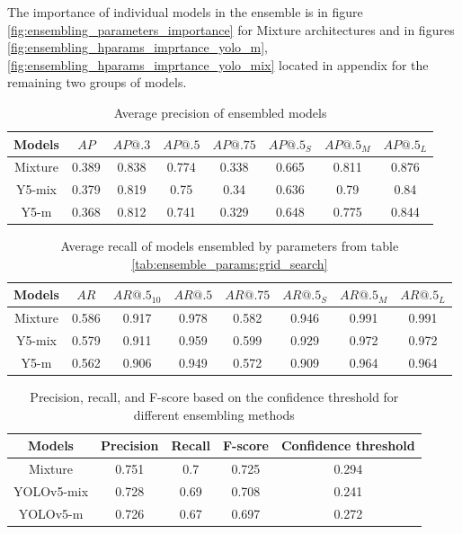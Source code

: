 The importance of individual models in the ensemble is in figure \ref{fig:ensembling_parameters_importance} for Mixture architectures and in figures \ref{fig:ensembling_hparams_imprtance_yolo_m}, \ref{fig:ensembling_hparams_imprtance_yolo_mix} located in appendix for the remaining two groups of models.


\begin{table}[h]
    \centering
    \begin{tabular}{|c|c|c|c|c|c|c|c|}
        \hline
        Models  & $AP$  & $AP@.3$ & $AP@.5$ & $AP@.75$ & $AP@.5_S$ & $AP@.5_M$ & $AP@.5_L$ \\ \hline
        Mixture & 0.389 & 0.838   & 0.774   & 0.338    & 0.665     & 0.811     & 0.876     \\ \hline
        Y5-mix  & 0.379 & 0.819   & 0.75    & 0.34     & 0.636     & 0.79      & 0.84      \\ \hline
        Y5-m    & 0.368 & 0.812   & 0.741   & 0.329    & 0.648     & 0.775     & 0.844     \\ \hline
    \end{tabular}
    \caption{Average precision of ensembled models}
    \label{tab:precision:ensemble_compare}
\end{table}


\begin{table}[h]
    \centering
    \begin{tabular}{|c|c|c|c|c|c|c|c|}
        \hline
        Models  & $AR$  & $AR@.5_{10}$ & $AR@.5$ & $AR@.75$ & $AR@.5_S$ & $AR@.5_M$ & $AR@.5_L$ \\ \hline
        Mixture & 0.586 & 0.917        & 0.978   & 0.582    & 0.946     & 0.991     & 0.991     \\ \hline
        Y5-mix  & 0.579 & 0.911        & 0.959   & 0.599    & 0.929     & 0.972     & 0.972     \\ \hline
        Y5-m    & 0.562 & 0.906        & 0.949   & 0.572    & 0.909     & 0.964     & 0.964     \\ \hline
    \end{tabular}
    \caption{Average recall of models ensembled by parameters from table \ref{tab:ensemble_params:grid_search}}
    \label{tab:recall:ensemble_compare}
\end{table}


\begin{table}[h]
    \begin{tabular}{|c|c|c|c|c|}
        \hline
        Models     & Precision & Recall & F-score & Confidence threshold \\ \hline
        Mixture    & 0.751     & 0.7    & 0.725   & 0.294                \\ \hline
        YOLOv5-mix & 0.728     & 0.69   & 0.708   & 0.241                \\ \hline
        YOLOv5-m   & 0.726     & 0.67   & 0.697   & 0.272                \\ \hline
    \end{tabular}
    \caption{Precision, recall, and F-score based on the confidence threshold for different ensembling methods}
    \label{tab:ensembling_prf:ensemble compare}
\end{table}

